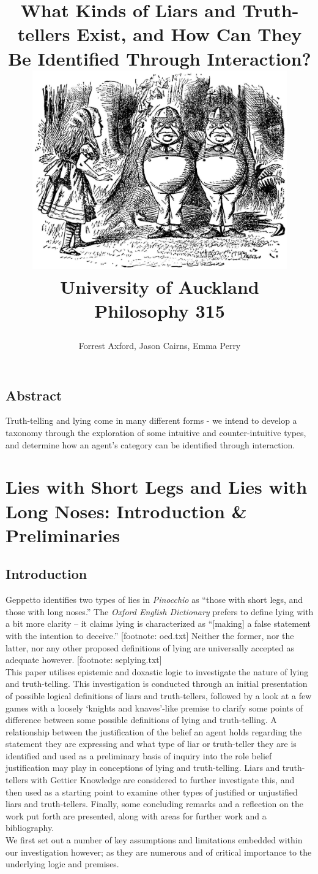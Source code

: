 \documentclass[12pt, titlepage, twoside, a4paper]{report}
\title{
{What Kinds of Liars and Truth-tellers Exist, and How Can They Be Identified Through Interaction?} \newline \newline
{\includegraphics[width=11cm]{alice.eps}}\\
{\large University of Auckland}\\
{\large Philosophy 315}\\
\author{Forrest Axford, Jason Cairns, Emma Perry}}
\begin{document}
\maketitle
\tableofcontents
\newpage
\section*{Abstract}
Truth-telling and lying come in many different forms - we intend to develop a taxonomy through the exploration of some intuitive and counter-intuitive types, and determine how an agent's category can be identified through interaction.

\chapter{Lies with Short Legs and Lies with Long Noses: Introduction \& Preliminaries}

\section{Introduction}
Geppetto identifies two types of lies in \textit{Pinocchio} as ``those with short legs, and those with long noses.'' The \textit{Oxford English Dictionary} prefers to define lying with a bit more clarity – it claims lying is characterized as “[making] a false statement with the intention to deceive.” [footnote: oed.txt] Neither the former, nor the latter, nor any other proposed definitions of lying are universally accepted as adequate however. [footnote: seplying.txt]\\
This paper utilises epistemic and doxastic logic to investigate the nature of lying and truth-telling. This investigation is conducted through an initial presentation of possible logical definitions of liars and truth-tellers, followed by a look at a few games with a loosely `knights and knaves’-like premise to clarify some points of difference between some possible definitions of lying and truth-telling. A relationship between the justification of the belief an agent holds regarding the statement they are expressing and what type of liar or truth-teller they are is identified and used as a preliminary basis of inquiry into the role belief justification may play in conceptions of lying and truth-telling. Liars and truth-tellers with Gettier Knowledge are considered to further investigate this, and then used as a starting point to examine other types of justified or unjustified liars and truth-tellers. Finally, some concluding remarks and a reflection on the work put forth are presented, along with areas for further work and a bibliography.\\
We first set out a number of key assumptions and limitations embedded within our investigation however; as they are numerous and of critical importance to the underlying logic and premises.
\end{document}
